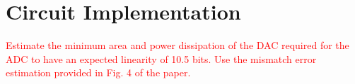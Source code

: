 \section{Circuit Implementation}

\textcolor{red}{Estimate the minimum area and power dissipation of the DAC
required for the ADC to have an expected linearity of 10.5 bits. Use the
mismatch error estimation provided in Fig. 4 of the paper.}

